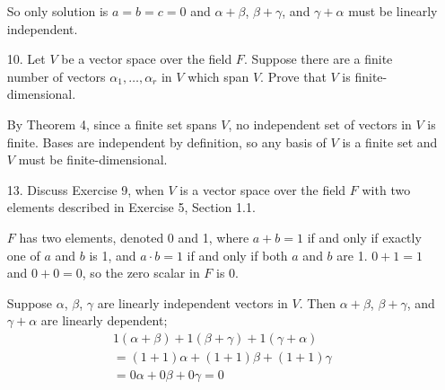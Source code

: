 \documentclass{article}
\begin{document}
\begin{enumerate}[listparindent=\parindent]
    So only solution is \(a = b = c = 0\) and \(\alpha + \beta\), \(\beta + \gamma\), and \(\gamma + \alpha\) must be linearly independent.

\item[10.] Let \(V\) be a vector space over the field \(F\). Suppose there are a finite number of vectors \(\alpha_1, \dots, \alpha_r\) in \(V\) which span \(V\).
    Prove that \(V\) is finite-dimensional.

    By Theorem 4, since a finite set spans \(V\), no independent set of vectors in \(V\) is finite.
    Bases are independent by definition, so any basis of \(V\) is a finite set and \(V\) must be finite-dimensional.

\item[13.] Discuss Exercise 9, when \(V\) is a vector space over the field \(F\) with two elements described in Exercise 5, Section 1.1.

    \(F\) has two elements, denoted 0 and 1, where \(a + b = 1\) if and only if exactly one of \(a\) and \(b\) is 1, and \(a \cdot b = 1\) if and only if both \(a\) and \(b\) are 1.
    \(0 + 1 = 1\) and \(0 + 0 = 0\), so the zero scalar in \(F\) is 0.

    Suppose \(\alpha\), \(\beta\), \(\gamma\) are linearly independent vectors in \(V\).
    Then \(\alpha + \beta\), \(\beta + \gamma\), and \(\gamma + \alpha\) are linearly dependent;
    \begin{gather*}
    1(\alpha + \beta) + 1(\beta + \gamma) + 1(\gamma + \alpha) \\
    = (1 + 1)\alpha + (1 + 1)\beta + (1 + 1)\gamma \\
    = 0\alpha + 0\beta + 0\gamma
    = 0
    \end{gather*}

\end{enumerate}
\end{document}
